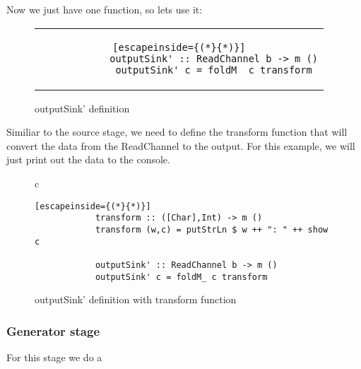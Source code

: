 Now we just have one function, so lets use it: 

\begin{figure}[H]
    \centering
    \begin{tabular}{c}
        \begin{lstlisting}[escapeinside={(*}{*)}]
            outputSink' :: ReadChannel b -> m ()
            outputSink' c = foldM_ c transform
        \end{lstlisting}
    \end{tabular}
    \caption{outputSink' definition}
    \label{fig:DP23}
\end{figure}

Similiar to the source stage, we need to define the transform function that will convert the data from the ReadChannel to the output. 
For this example, we will just print out the data to the console.

\begin{figure}[H]
    \centering
    \begin{tabular}{c}
        \begin{lstlisting}[escapeinside={(*}{*)}]
            transform :: ([Char],Int) -> m ()
            transform (w,c) = putStrLn $ w ++ ": " ++ show c

            outputSink' :: ReadChannel b -> m ()
            outputSink' c = foldM_ c transform
        \end{lstlisting}
    \end{tabular}
    \caption{outputSink' definition with transform function}
    \label{fig:DP24}
\end{figure}

\subsubsection{Generator stage}
For this stage we do a 

